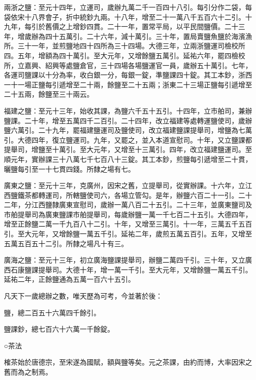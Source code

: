 \begin{pinyinscope}
 兩浙之鹽：至元十四年，立運司，歲辦九萬二千一百四十八引。每引分作二袋，每袋依宋十八界會子，折中統鈔九兩。十八年，增至二十一萬八千五百六十二引。十九年，每引於舊價之上增鈔四貫。二十一年，置常平局，以平民間鹽價。二十三年，增歲辦為四十五萬引。二十六年，減十萬引。三十年，置局賣鹽魚鹽於海濱漁所。三十一年，並煎鹽地四十四所為三十四場。大德三年，立兩浙鹽運司檢校所四。五年，增額為四十萬引。至大元年，又增餘鹽五萬引。延祐六年，罷四檢校所，立嘉興、紹興等處鹽倉官，三十四場各場鹽運官一員，歲辦五十萬引。七年，各運司鹽課以十分為率，收白銀一分，每銀一錠，準鹽課四十錠。其工本鈔，浙西一十一場正鹽每引遞增至二十兩，餘鹽至二十五兩；浙東二十三場正鹽每引遞增至二十五兩，餘鹽至三十兩云。



 福建之鹽：至元十三年，始收其課，為鹽六千五十五引。十四年，立市舶司，兼辦鹽課。二十年，增至五萬四千二百引。二十四年，改立福建等處轉運鹽使司，歲辦鹽六萬引。二十九年，罷福建鹽運司及鹽使司，改立福建鹽課提舉司，增鹽為七萬引。大德四年，復立鹽運司。九年，又罷之，並入本道宣慰司。十年，又立鹽課都提舉司，增鹽至十萬引。至大元年，又增至十三萬引。四年，改立福建鹽運司。至順元年，實辦課三十八萬七千七百八十三錠。其工本鈔，煎鹽每引遞增至二十貫，曬鹽每引至一十七貫四錢。所隸之場有七。



 廣東之鹽：至元十三年，克廣州，因宋之舊，立提舉司，從實辦課。十六年，立江西鹽鐵茶都轉運司，所轄鹽使司六，各場立管勾。是年，辦鹽六百二十一引。二十二年，分江西鹽隸廣東宣慰司，歲辦一萬八百二十五引。二十三年，並廣東鹽司及市舶提舉司為廣東鹽課市舶提舉司，每歲辦鹽一萬一千七百二十五引。大德四年，增至正餘鹽二萬一千九百八十二引。十年，又增至三萬引。十一年，三萬五千五百引。至大元年，又增餘鹽一萬五千引。延祐二年，歲煎五萬五百引。五年，又增至五萬五百五十二引。所隸之場凡十有三。



 廣海之鹽：至元十三年，初立廣海鹽課提舉司，辦鹽二萬四千引。三十年，又立廣西石康鹽課提舉司。大德十年，增一萬一千引。至大元年，又增餘鹽一萬五千引。延祐二年，正餘鹽通為五萬一百六十五引。



 凡天下一歲總辦之數，唯天歷為可考，今並著於後：



 鹽，總二百五十六萬四千餘引。



 鹽課鈔，總七百六十六萬一千餘錠。



 ○茶法



 榷茶始於唐德宗，至宋遂為國賦，額與鹽等矣。元之茶課，由約而博，大率因宋之舊而為之制焉。




\end{pinyinscope}
